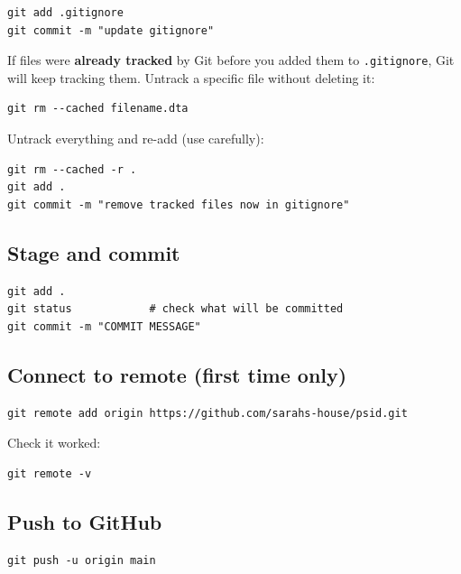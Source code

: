 \documentclass[11pt]{article}
\begin{document}
\begin{lstlisting}[style=bash]
git add .gitignore
git commit -m "update gitignore"
\end{lstlisting}

If files were \textbf{already tracked} by Git before you added them to \texttt{.gitignore}, Git will keep tracking them. Untrack a specific file without deleting it:

\begin{lstlisting}[style=bash]
git rm --cached filename.dta
\end{lstlisting}

Untrack everything and re-add (use carefully):

\begin{lstlisting}[style=bash]
git rm --cached -r .
git add .
git commit -m "remove tracked files now in gitignore"
\end{lstlisting}

\subsection{Stage and commit}

\begin{lstlisting}[style=bash]
git add .
git status            # check what will be committed
git commit -m "COMMIT MESSAGE"
\end{lstlisting}

\subsection{Connect to remote (first time only)}

\begin{lstlisting}[style=bash]
git remote add origin https://github.com/sarahs-house/psid.git
\end{lstlisting}

Check it worked:

\begin{lstlisting}[style=bash]
git remote -v
\end{lstlisting}

\subsection{Push to GitHub}

\begin{lstlisting}[style=bash]
git push -u origin main
\end{lstlisting}
\end{document}
